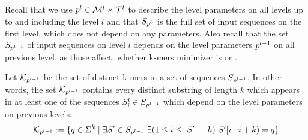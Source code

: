 \documentclass[a4paper,titlepage,onecolumn,oneside,12pt,nenglish,titlepage=firstiscover]{scrbook}
\theoremstyle{plain} %
\theoremstyle{definition} %
\theoremstyle{remark} %
\theoremstyle{plain}
\newcommand{\minimizerLength}{m}
\newcommand{\level}{l}
\newcommand{\kmer}{q}
\newcommand{\possibleMinimizerLengths}{\mathcal{M}}
\newcommand{\possibleThresholds}{\mathcal{T}}
\begin{document}
\newcommand{\compactZV}[2]{#1[#2]}
\newcommand{\manualZV}[3]{#1[#2, #3]}
\newcommand{\ZVM}[1]{\manualZV{M}{\levelParameters{#1-1}}{\parameterAccess{#1}{\minimizerLength}{#1}}}
\newcommand{\ZVK}[1]{\manualZV{K}{\levelParameters{#1-1}}{\parameterAccess{#1}{\minimizerLength}{#1}}}

\newcommand{\probabilityDistribution}[1]{p_{#1}}

\newcommand{\CDF}[1]{F_{#1}}
\newcommand{\varCDF}[1]{\textbf{F}_{#1}}

Recall that we use $\levelParameters{\level} \in \possibleMinimizerLengths^\level \times \possibleThresholds^\level$ to describe the level parameters on all levels up to and including the level $\level$ and that $S_{p^{0}}$ is the full set of input sequences on the first level, which does not depend on any parameters. Also recall that the set $\sequences{\level-1}$ of input sequences on level $\level$ depends on the level parameters $\levelParameters{\level-1}$ on all previous level, as those affect, whether k-mers minimizer is \frequent or \infrequent.

Let $\distinctKmers{\level}$ be the set of distinct k-mers in a set of sequences $\sequences{\level-1}$. In other words, the set $\distinctKmers{\level}$ contains every distinct substring of length $k$ which appears in at least one of the sequences $S^\level_i \in \sequences{\level-1}$ which depend on the level parameters on previous levels:
\begin{equation}
	\distinctKmers{\level} := \{\kmer \in \Sigma^k \mid \exists S' \in \sequences{\level-1} ~ \exists (1 \leq i \leq |S'|-k) ~ S'[i:i+k) = \kmer \}
\end{equation}
\end{document}
